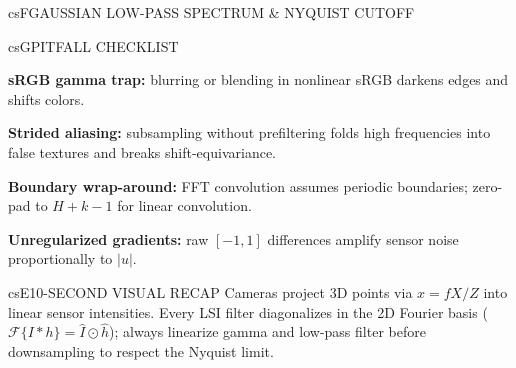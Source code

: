 \documentclass[../../../../master.tex]{subfiles}
\begin{document}
\begin{cscolumns}
\begin{cscard}{csF}{GAUSSIAN LOW-PASS SPECTRUM \& NYQUIST CUTOFF}
  \centering
\end{cscard}
\columnbreak

\begin{cscard}{csG}{PITFALL CHECKLIST}
  \begin{csbul}
    \item \textbf{sRGB gamma trap:} blurring or blending in nonlinear sRGB darkens edges and shifts colors.
    \item \textbf{Strided aliasing:} subsampling without prefiltering folds high frequencies into false textures and breaks shift-equivariance.
    \item \textbf{Boundary wrap-around:} FFT convolution assumes periodic boundaries; zero-pad to $H+k-1$ for linear convolution.
    \item \textbf{Unregularized gradients:} raw $[-1, 1]$ differences amplify sensor noise proportionally to $|u|$.
  \end{csbul}
\end{cscard}

\begin{cscard}{csE}{10-SECOND VISUAL RECAP}
  \sffamily\footnotesize
  Cameras project 3D points via $x=fX/Z$ into linear sensor intensities. Every LSI filter diagonalizes in the 2D Fourier basis ($\mathcal{F}\{I*h\}=\hat I\odot\hat h$); always linearize gamma and low-pass filter before downsampling to respect the Nyquist limit.
\end{cscard}
\end{cscolumns}

\csend
\end{document}
